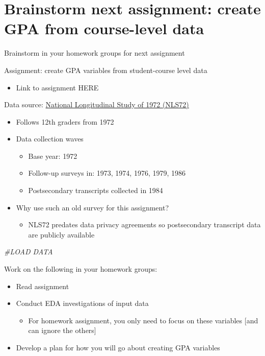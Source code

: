 \documentclass[8pt,ignorenonframetext,dvipsnames]{beamer}
\newenvironment{Shaded}{\begin{snugshade}}{\end{snugshade}}
\newcommand{\CommentTok}[1]{\textcolor[rgb]{0.56,0.35,0.01}{\textit{#1}}}
\providecommand{\tightlist}{%
  \setlength{\itemsep}{0pt}\setlength{\parskip}{0pt}}
\begin{document}
\section{Brainstorm next assignment: create GPA from course-level
data}\label{brainstorm-next-assignment-create-gpa-from-course-level-data}

\begin{frame}[fragile]{Brainstorm in your homework groups for next
assignment}

Assignment: create GPA variables from student-course level data

\begin{itemize}
\tightlist
\item
  Link to assignment HERE
\end{itemize}

Data source: \href{https://nces.ed.gov/surveys/nls72/}{National
Longitudinal Study of 1972 (NLS72)}

\begin{itemize}
\tightlist
\item
  Follows 12th graders from 1972
\item
  Data collection waves

  \begin{itemize}
  \tightlist
  \item
    Base year: 1972
  \item
    Follow-up surveys in: 1973, 1974, 1976, 1979, 1986
  \item
    Postsecondary transcripts collected in 1984
  \end{itemize}
\item
  Why use such an old survey for this assignment?

  \begin{itemize}
  \tightlist
  \item
    NLS72 predates data privacy agreements so postsecondary transcript
    data are publicly available
  \end{itemize}
\end{itemize}

\begin{Shaded}
\begin{Highlighting}[]
\CommentTok{#LOAD DATA}
\end{Highlighting}
\end{Shaded}

Work on the following in your homework groups:

\begin{itemize}
\tightlist
\item
  Read assignment
\item
  Conduct EDA investigations of input data

  \begin{itemize}
  \tightlist
  \item
    For homework assignment, you only need to focus on these variables
    {[}and can ignore the others{]}
  \end{itemize}
\item
  Develop a plan for how you will go about creating GPA variables
\end{itemize}

\end{frame}
\end{document}
